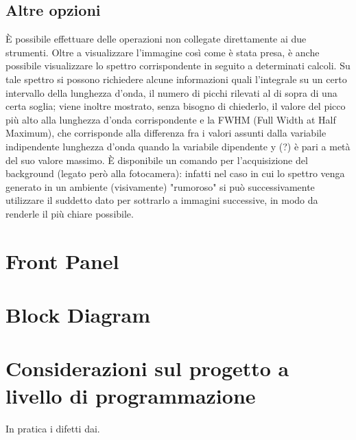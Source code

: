 \subsection{Altre opzioni}
È possibile effettuare delle operazioni non collegate direttamente ai due strumenti. Oltre a visualizzare l'immagine così come è stata presa, è anche possibile visualizzare lo spettro corrispondente in seguito a determinati calcoli. Su tale spettro si possono richiedere alcune informazioni quali l'integrale su un certo intervallo della lunghezza d'onda, il numero di picchi rilevati al di sopra di una certa soglia; viene inoltre mostrato, senza bisogno di chiederlo, il valore del picco più alto alla lunghezza d'onda corrispondente e la FWHM (Full Width at Half Maximum), che corrisponde alla differenza fra i valori assunti dalla variabile indipendente lunghezza d'onda quando la variabile dipendente y (?) è pari a metà del suo valore massimo.
È disponibile un comando per l'acquisizione del background (legato però alla fotocamera): infatti nel caso in cui lo spettro venga generato in un ambiente (visivamente) "rumoroso" si può successivamente utilizzare il suddetto dato per sottrarlo a immagini successive, in modo da renderle il più chiare possibile.

\section{Front Panel}

\section{Block Diagram}

\section{Considerazioni sul progetto a livello di programmazione}

In pratica i difetti dai.